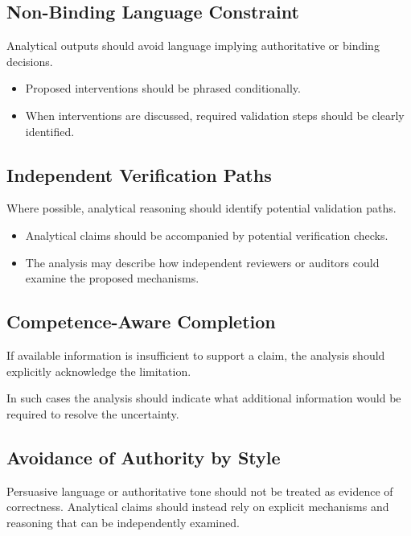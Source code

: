 \subsection{Non-Binding Language Constraint}

Analytical outputs should avoid language implying authoritative or
binding decisions.

\begin{itemize}
\item Proposed interventions should be phrased conditionally.
\item When interventions are discussed, required validation steps should
be clearly identified.
\end{itemize}

\subsection{Independent Verification Paths}

Where possible, analytical reasoning should identify potential validation
paths.

\begin{itemize}
\item Analytical claims should be accompanied by potential verification
checks.
\item The analysis may describe how independent reviewers or auditors
could examine the proposed mechanisms.
\end{itemize}

\subsection{Competence-Aware Completion}

If available information is insufficient to support a claim, the analysis
should explicitly acknowledge the limitation.

In such cases the analysis should indicate what additional information
would be required to resolve the uncertainty.

\subsection{Avoidance of Authority by Style}

Persuasive language or authoritative tone should not be treated as
evidence of correctness. Analytical claims should instead rely on
explicit mechanisms and reasoning that can be independently examined.

